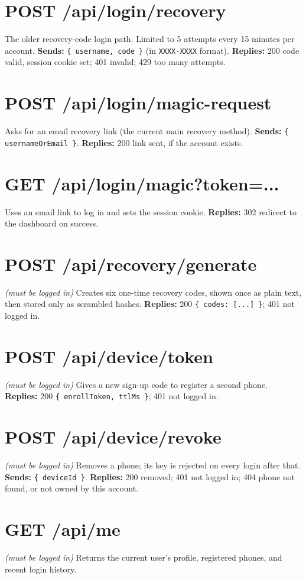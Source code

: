 \section*{POST /api/login/recovery}
The older recovery-code login path. Limited to 5 attempts every 15 minutes
per account.
\textbf{Sends:} \texttt{\{ username, code \}} (in \texttt{XXXX-XXXX}
format).
\textbf{Replies:} 200 code valid, session cookie set; 401 invalid; 429 too
many attempts.

\section*{POST /api/\allowbreak login/\allowbreak magic-request}
Asks for an email recovery link (the current main recovery method).
\textbf{Sends:} \texttt{\{ usernameOrEmail \}}.
\textbf{Replies:} 200 link sent, if the account exists.

\section*{GET /api/login/magic?token=...}
Uses an email link to log in and sets the session cookie.
\textbf{Replies:} 302 redirect to the dashboard on success.

\section*{POST /api/recovery/generate} \textit{(must be logged in)}
Creates six one-time recovery codes, shown once as plain text, then stored
only as scrambled hashes.
\textbf{Replies:} 200 \texttt{\{ codes: [...] \}}; 401 not logged in.

\section*{POST /api/device/token} \textit{(must be logged in)}
Gives a new sign-up code to register a second phone.
\textbf{Replies:} 200 \texttt{\{ enrollToken, ttlMs \}}; 401 not logged
in.

\section*{POST /api/device/revoke} \textit{(must be logged in)}
Removes a phone; its key is rejected on every login after that.
\textbf{Sends:} \texttt{\{ deviceId \}}.
\textbf{Replies:} 200 removed; 401 not logged in; 404 phone not found, or
not owned by this account.

\section*{GET /api/me} \textit{(must be logged in)}
Returns the current user's profile, registered phones, and recent login
history.

